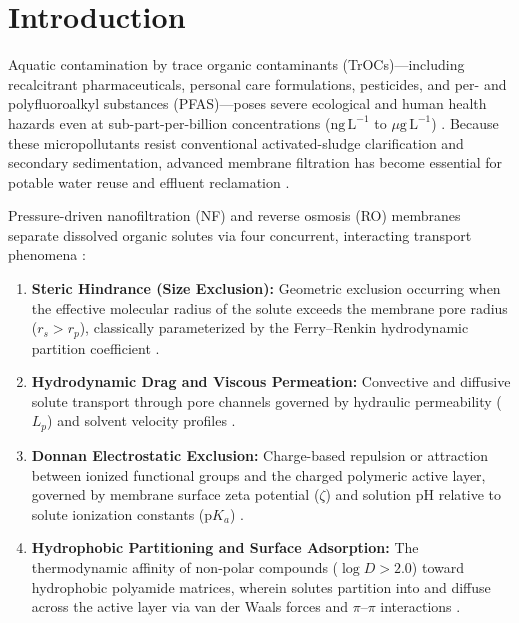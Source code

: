 \documentclass[10pt,twocolumn]{article}
\begin{document}
\section{Introduction}
\label{sec:intro}

Aquatic contamination by trace organic contaminants (TrOCs)---including recalcitrant pharmaceuticals, personal care formulations, pesticides, and per- and polyfluoroalkyl substances (PFAS)---poses severe ecological and human health hazards even at sub-part-per-billion concentrations ($\mathrm{ng\,L^{-1}}$ to $\mu\mathrm{g\,L^{-1}}$) \cite{schwarzenbach2006,shannon2008,bellona2004}. Because these micropollutants resist conventional activated-sludge clarification and secondary sedimentation, advanced membrane filtration has become essential for potable water reuse and effluent reclamation \cite{verliefde2007,elimelech2011,werber2016,mohammad2015}.

Pressure-driven nanofiltration (NF) and reverse osmosis (RO) membranes separate dissolved organic solutes via four concurrent, interacting transport phenomena \cite{vanderbruggen2003,yangaliquintanilla2009}:
\begin{enumerate}[leftmargin=1.3em,itemsep=2pt,topsep=3pt]
\item \textbf{Steric Hindrance (Size Exclusion):} Geometric exclusion occurring when the effective molecular radius of the solute exceeds the membrane pore radius ($r_s > r_p$), classically parameterized by the Ferry--Renkin hydrodynamic partition coefficient \cite{ferry1936,renkin1954}.
\item \textbf{Hydrodynamic Drag and Viscous Permeation:} Convective and diffusive solute transport through pore channels governed by hydraulic permeability ($L_p$) and solvent velocity profiles \cite{spiegler1966,kedem1958}.
\item \textbf{Donnan Electrostatic Exclusion:} Charge-based repulsion or attraction between ionized functional groups and the charged polymeric active layer, governed by membrane surface zeta potential ($\zeta$) and solution pH relative to solute ionization constants ($\mathrm{p}K_a$) \cite{bowen2002,bowen1998}.
\item \textbf{Hydrophobic Partitioning and Surface Adsorption:} The thermodynamic affinity of non-polar compounds ($\log D > 2.0$) toward hydrophobic polyamide matrices, wherein solutes partition into and diffuse across the active layer via van der Waals forces and $\pi$--$\pi$ interactions \cite{kiso2001,nghiem2005}.
\end{enumerate}
\end{document}
